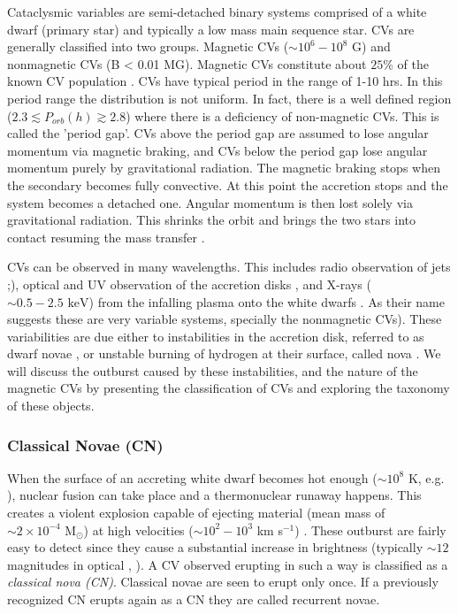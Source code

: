 Cataclysmic variables are semi-detached binary systems comprised of a white dwarf (primary star) and typically a low mass main sequence star. CVs are generally classified into two groups. Magnetic CVs ($\sim 10^6 - 10^8$ G) and nonmagnetic CVs (B < 0.01 MG). Magnetic CVs constitute about $25 \%$ of the known CV population \citep{balman_x-ray_2012}. CVs have typical period in the range of 1-10 hrs. In this period range the distribution is not uniform. In fact, there is a well defined region ($2.3 \lesssim P_{orb} (h) \gtrsim 2.8$) where there is a deficiency of non-magnetic CVs. This is called the 'period gap'. CVs above the period gap are assumed to lose  angular momentum via magnetic braking, and CVs below the period gap lose angular momentum purely by gravitational radiation. The magnetic braking  stops when the secondary becomes fully convective. At this point the accretion stops and the system becomes a detached one. Angular momentum is then lost solely via gravitational radiation. This shrinks the orbit and brings the two stars into contact resuming the mass transfer \citep[e.g.][]{warner_cataclysmic_2003}.

CVs can be observed in many wavelengths. This includes radio observation of jets \citep{nova_jets_2008};\citep{coppejans_novalike_2015}), optical and UV observation of the accretion disks \citep{1994ASPC...54...61K}, and X-rays ($\sim 0.5-2.5 \text{ keV}$) from the infalling plasma onto the white dwarfs \citep{verbunt_cataclysmic_1997}. As their name suggests these are very variable systems, specially the nonmagnetic CVs). These variabilities are due either to instabilities in the accretion disk, referred to as dwarf novae \citep{osaki_accretion_1974}, or unstable burning of hydrogen at their surface, called nova \citep{starrfield_thermonuclear_2016}. We will discuss the outburst caused by these instabilities, and the nature of the magnetic CVs by presenting the classification of CVs and exploring the taxonomy of these objects.  

\subsubsection{Classical Novae (CN)}

When the surface of an accreting white dwarf becomes hot enough ($\sim 10^8$ K, e.g. \cite{starrfield_thermonuclear_2016}), nuclear fusion can take place and a thermonuclear runaway happens. This creates a violent explosion capable of ejecting material (mean mass of $\sim 2 \times 10^{-4} \text{ M}_\odot$) at high velocities ($\sim 10^2 - 10^3$ km s$^{-1}$) \citep{gehrz_nucleosynthesis_1998,shara_recent_1989}. These outburst are fairly easy to detect since they cause a substantial increase in brightness (typically $\sim 12$ magnitudes in optical , \citealt{shara_recent_1989}). A CV observed erupting in such a way is classified as a \emph{classical nova (CN)}. Classical novae are seen to erupt only once. If a previously recognized CN erupts again as a CN they are called recurrent novae. 


